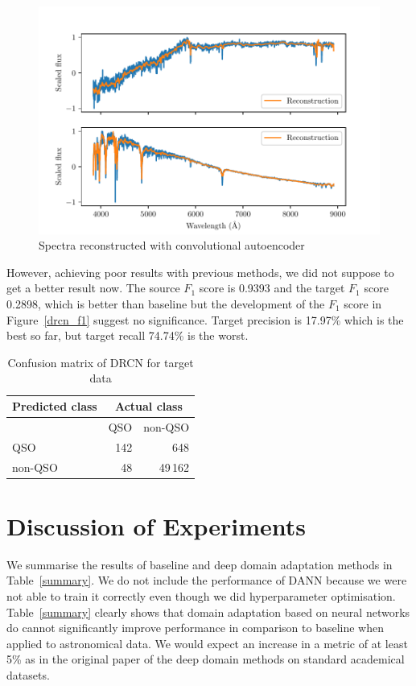 \begin{figure}
\includegraphics[width=\textwidth]{img/reconstructed_spectra.pdf}
\caption{Spectra reconstructed with convolutional autoencoder}
\label{reconstruction}
\end{figure}

However, achieving poor results with previous methods,
we did not suppose to get a better result now.
The source \(F_1\) score is 0.9393 and the target \(F_1\) score 0.2898,
which is better than baseline
but the development of the \(F_1\) score in Figure~\ref{drcn_f1} suggest no significance.
Target precision is 17.97\% which is the best so far,
but target recall 74.74\% is the worst.

\begin{table}
\begin{center}
\begin{tabular}{|l|r|r|}
	\hline
	Predicted class & \multicolumn{2}{c|}{Actual class} \\
	\hline \hline
	& QSO & non-QSO \\ \hline
	QSO & 142 & 648 \\ \hline
	non-QSO & 48 & 49\,162 \\ \hline
\end{tabular}
\end{center}
\caption{Confusion matrix of DRCN for target data}
\end{table}

\section{Discussion of Experiments}

We summarise the results of baseline and deep domain adaptation methods in Table~\ref{summary}.
We do not include the performance of DANN
because we were not able to train it correctly even though we did hyperparameter optimisation.
Table~\ref{summary} clearly shows that domain adaptation based on neural networks do cannot significantly improve performance in comparison to baseline
when applied to astronomical data.
We would expect an increase in a metric of at least 5\% as in the original paper of the deep domain methods on standard academical datasets.

